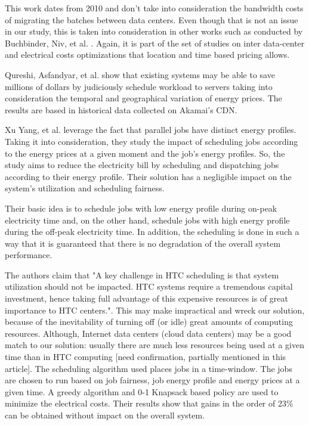 This work dates from 2010 and don't take into consideration the bandwidth costs
of migrating the batches between data centers. Even though that is not an issue
in our study, this is taken into consideration in other works such as conducted by Buchbinder, Niv, et al.
\cite{MIGRATION_CLOUD}. Again, it is part of the set of studies on inter
data-center and electrical costs optimizations that location and time based 
pricing allows.


Qureshi, Asfandyar, et al. \cite{CUTTING_BILL} show that existing systems may be able to
save millions of dollars by judiciously schedule workload to servers taking into
consideration the temporal and geographical variation of energy prices. The
results are based in historical data collected on Akamai's CDN. 

Xu Yang, et al. \cite{DYN_PRICING_HPC} leverage the fact that parallel jobs have 
distinct energy profiles. Taking it into consideration, they study the impact of
scheduling jobs according to the energy prices at a given moment and the job's
energy profiles. So, the study aims to reduce the electricity bill by scheduling and
dispatching jobs according to their energy profile. Their solution has a
negligible impact on the system's utilization and scheduling fairness. 

Their basic idea is to schedule jobs with low energy profile during on-peak
electricity time and, on the other hand, schedule jobs with high energy profile
during the off-peak electricity time. In addition, the scheduling is done in
such a way that it is guaranteed that there is no degradation of the overall
system performance. 

The authors claim that "A key challenge in HTC scheduling is that system 
utilization should not be impacted. HTC systems require a tremendous capital 
investment, hence taking full advantage of this expensive resources is of great 
importance to HTC centers.". This may make impractical and wreck our solution,
because of the inevitability of turning off (or idle) great amounts of computing 
resources. Although, Internet data centers (cloud data centers)  may be a good 
match to our solution: usually there are much less resources being used at a given 
time than in HTC computing [need confirmation, partially mentioned in this article]. The scheduling algorithm used places jobs in a time-window. The jobs are chosen
to run based on job fairness, job energy profile and energy prices at a given
time. A greedy algorithm and 0-1 Knapsack based policy are used to minimize the
electrical costs. Their results show that gains in the order of 23\% can be obtained without
impact on the overall system. 

